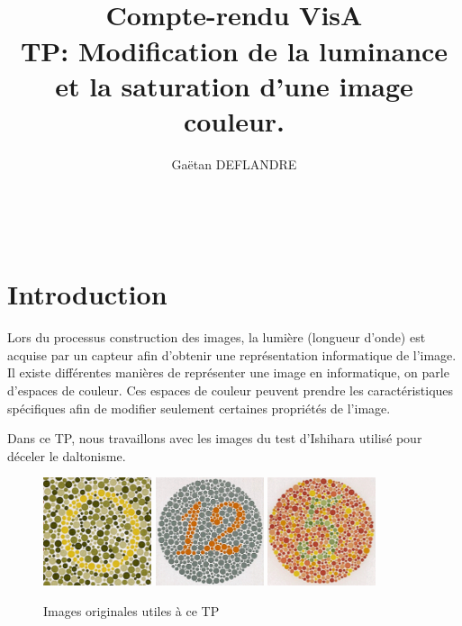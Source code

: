 \documentclass[a4paper,11pt]{article}
\title{
  \noindent\hrulefill \\
  \vspace{10mm}
  \textbf{Compte-rendu VisA} \\
  \vspace{5mm}
  TP: Modification de la luminance et la saturation d'une image couleur.
}
\author{Gaëtan DEFLANDRE}
\begin{document}
\maketitle
\noindent\hrulefill \\


\section*{Introduction}

Lors du processus construction des images, la lumière (longueur d'onde)  
est acquise par un capteur afin d'obtenir une représentation 
informatique de l'image. Il existe différentes manières de représenter 
une image en informatique, on parle d'espaces de couleur. Ces espaces 
de couleur peuvent prendre les caractéristiques spécifiques afin 
de modifier seulement certaines propriétés de l'image.   

\newpage

Dans ce TP, nous travaillons avec les images du test d'Ishihara utilisé 
pour déceler le daltonisme.

\begin{figure}[H]
  \begin{center}
    \includegraphics[width=120px]{images/it1_72pp.png}
    \includegraphics[width=120px]{images/it2_72pp.png}
    \includegraphics[width=120px]{images/it3_72pp.png}
    \caption{Images originales utiles à ce TP}
  \end{center}
\end{figure}
\end{document}
